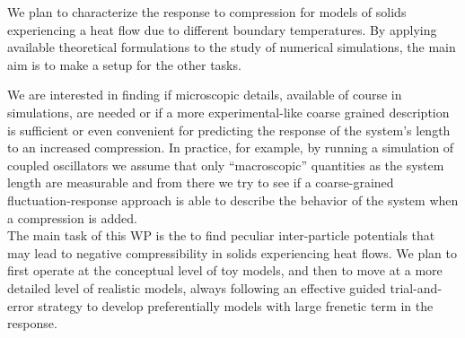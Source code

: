 \begin{workpackage}[id=WPcompress,wphases=0-48,
  short=Nonequilibrium compressibility, %
  title=Nonequilibrium compressibility, %
  lead=UNIPD,
  UNIPDRM=48]
\begin{wpdescription}
\end{wpdescription}

\begin{tasklist}

  \begin{task}[title=TASK1,id=task1,PM=3,lead=UNIPD,wphases={0-12!1,12-18!0.5}]
 
    We plan to characterize the response to compression
    for models of solids experiencing a heat flow due to different boundary temperatures.
    By applying available theoretical formulations to the study of numerical simulations,
    the main aim is to make a setup for the other tasks.
    
  \end{task}

  \begin{task}[title=TASK2,id=task2,PM=3,lead=UNIPD,wphases={12-24!0.5},partners={KUL}]

    We are interested in finding if microscopic details, available of course in simulations, 
    are needed or if a more experimental-like coarse grained description is sufficient or even convenient for
    predicting the response of the system's length to an increased compression. In practice, for example,
    by running a simulation of coupled oscillators we assume that only ``macroscopic'' quantities as the system length
    are measurable and from there we try to see if a coarse-grained fluctuation-response approach is able to
    describe the behavior of the system when a compression is added.\\
    The main task of this WP is the to
        find peculiar inter-particle potentials that may lead to negative 
        compressibility in solids experiencing heat flows. 
        We plan to first operate at the conceptual level of toy models, and then to move
        at a more detailed level of realistic models, always following an effective guided
        trial-and-error strategy to develop preferentially models with large
        frenetic term in the response.
    
  \end{task}


\end{tasklist}
\end{workpackage}
